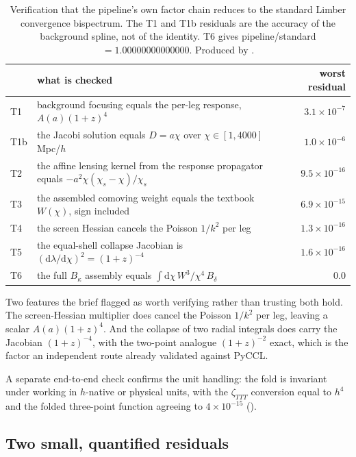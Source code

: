 \begin{table}[h]
\centering
\begin{tabular}{llr}
\toprule
& what is checked & worst residual \\
\midrule
T1  & background focusing equals the per-leg response, $A(a)(1+z)^4$ & $3.1\times10^{-7}$ \\
T1b & the Jacobi solution equals $D=a\chi$ over $\chi\in[1,4000]$ Mpc/$h$ & $1.0\times10^{-6}$ \\
T2  & the affine lensing kernel from the response propagator equals
      $-a^2\chi(\chi_s-\chi)/\chi_s$ & $9.5\times10^{-16}$ \\
T3  & the assembled comoving weight equals the textbook $W(\chi)$, sign included & $6.9\times10^{-15}$ \\
T4  & the screen Hessian cancels the Poisson $1/k^2$ per leg & $1.3\times10^{-16}$ \\
T5  & the equal-shell collapse Jacobian is $(\mathrm{d}\lambda/\mathrm{d}\chi)^2=(1+z)^{-4}$ & $1.6\times10^{-16}$ \\
T6  & the full $B_\kappa$ assembly equals $\int\mathrm{d}\chi\,W^3/\chi^4\,B_\delta$ & $0.0$ \\
\bottomrule
\end{tabular}
\caption{Verification that the pipeline's own factor chain reduces to the
standard Limber convergence bispectrum. The T1 and T1b residuals are the
accuracy of the background spline, not of the identity. T6 gives
pipeline/standard $=1.00000000000000$. Produced by
.}
\label{tab:chain}
\end{table}

Two features the brief flagged as worth verifying rather than trusting both
hold. The screen-Hessian multiplier does cancel the Poisson $1/k^2$ per
leg, leaving a scalar $A(a)(1+z)^4$. And the collapse of two radial
integrals does carry the Jacobian $(1+z)^{-4}$, with the two-point analogue
$(1+z)^{-2}$ exact, which is the factor an independent route already
validated against PyCCL.

A separate end-to-end check confirms the unit handling: the fold is
invariant under working in $h$-native or physical units, with the
$\zeta_{TTT}$ conversion equal to $h^4$ and the folded three-point function
agreeing to $4\times10^{-15}$
().

\subsection{Two small, quantified residuals}

